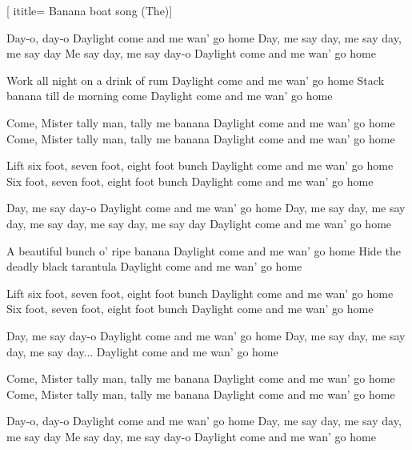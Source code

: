 [
ititle= {Banana boat song (The)}]

\beginchorus
Day-o, day-o
Daylight come and me wan' go home
Day, me say day, me say day, me say day
Me say day, me say day-o
Daylight come and me wan' go home
\endchorus

\beginverse
Work all night on a drink of rum
Daylight come and me wan' go home
Stack banana till de morning come
Daylight come and me wan' go home
\endverse

\beginverse
Come, Mister tally man, tally me banana
Daylight come and me wan' go home
Come, Mister tally man, tally me banana
Daylight come and me wan' go home
\endverse

\beginverse
Lift six foot, seven foot, eight foot bunch
Daylight come and me wan' go home
Six foot, seven foot, eight foot bunch
Daylight come and me wan' go home
\endverse

\beginchorus
Day, me say day-o
Daylight come and me wan' go home
Day, me say day, me say day, me say day, me say day, me say day
Daylight come and me wan' go home
\endchorus

\beginverse
A beautiful bunch o' ripe banana
Daylight come and me wan' go home
Hide the deadly black tarantula
Daylight come and me wan' go home
\endverse

\beginverse
Lift six foot, seven foot, eight foot bunch
Daylight come and me wan' go home
Six foot, seven foot, eight foot bunch
Daylight come and me wan' go home
\endverse

\beginchorus
Day, me say day-o
Daylight come and me wan' go home
Day, me say day, me say day, me say day...
Daylight come and me wan' go home
\endchorus

\beginverse
Come, Mister tally man, tally me banana
Daylight come and me wan' go home
Come, Mister tally man, tally me banana
Daylight come and me wan' go home
\endverse

\beginchorus
Day-o, day-o
Daylight come and me wan' go home
Day, me say day, me say day, me say day
Me say day, me say day-o
Daylight come and me wan' go home
\endchorus

\endsong